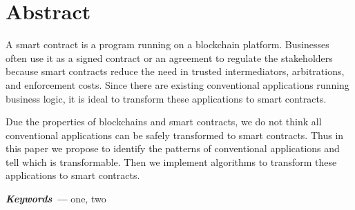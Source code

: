 \chapter{Abstract}

A smart contract is a program running on a blockchain platform.
Businesses often use it as a signed contract or an agreement to regulate the stakeholders
because smart contracts reduce the need in trusted intermediators, arbitrations, and enforcement costs.
Since there are existing conventional applications running business logic,
it is ideal to transform these applications to smart contracts.

Due the properties of blockchains and smart contracts, we do not think all conventional applications can be safely transformed to smart contracts.
Thus in this paper we propose to identify the patterns of conventional applications and tell which is transformable.
Then we implement algorithms to transform these applications to smart contracts.

\textbf{\textit{Keywords ---}} one, two
